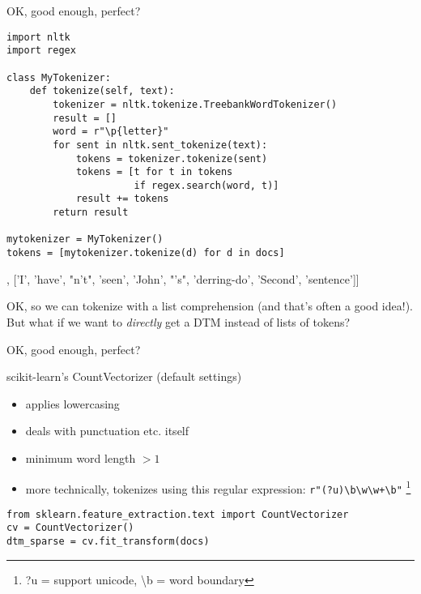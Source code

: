 \begin{frame}[fragile]{OK, good enough, perfect?}
\begin{verbatim}
import nltk
import regex

class MyTokenizer:
    def tokenize(self, text):
        tokenizer = nltk.tokenize.TreebankWordTokenizer()
        result = []
        word = r"\p{letter}"
        for sent in nltk.sent_tokenize(text):
            tokens = tokenizer.tokenize(sent)    
            tokens = [t for t in tokens 
                      if regex.search(word, t)]
            result += tokens
        return result
        
mytokenizer = MyTokenizer()
tokens = [mytokenizer.tokenize(d) for d in docs]

\end{verbatim}

\begin{lstlistingoutputtiny}
[['This', 'is', 'a', 'text'], ['I', 'have', "n't", 'seen', 'John', "'s", 'derring-do', 'Second', 'sentence']]
\end{lstlistingoutputtiny}
\end{frame}






\begin{frame}[standout]
OK, so we can tokenize with a list comprehension (and that's often a good idea!). But what if we want to \emph{directly} get a DTM instead of lists of tokens?
\end{frame}


\begin{frame}[fragile]{OK, good enough, perfect?}
  \begin{block}{scikit-learn's CountVectorizer (default settings)}
    \begin{itemize}
    \item applies lowercasing
    \item deals with punctuation etc. itself
    \item minimum word length $>1$
    \item more technically, tokenizes using this regular expression: \texttt{r"(?u)\textbackslash b\textbackslash w\textbackslash w+\textbackslash b"} \footnote{?u = support unicode, \textbackslash b = word boundary}
    \end{itemize}
  \end{block}
\begin{lstlisting}
from sklearn.feature_extraction.text import CountVectorizer
cv = CountVectorizer()
dtm_sparse = cv.fit_transform(docs)
\end{lstlisting}
\end{frame}


